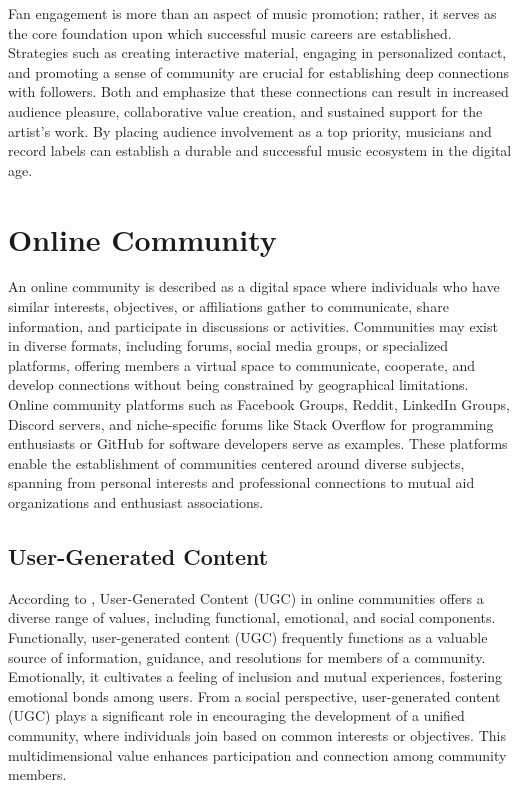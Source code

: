Fan engagement is more than an aspect of music promotion; rather, it serves as the core foundation upon which successful music careers are established. Strategies such as creating interactive material, engaging in personalized contact, and promoting a sense of community are crucial for establishing deep connections with followers. Both \textcite{edlom21} and \textcite{lee20} emphasize that these connections can result in increased audience pleasure, collaborative value creation, and sustained support for the artist's work. By placing audience involvement as a top priority, musicians and record labels can establish a durable and successful music ecosystem in the digital age.

\section{Online Community}
An online community is described as a digital space where individuals who have similar interests, objectives, or affiliations gather to communicate, share information, and participate in discussions or activities. Communities may exist in diverse formats, including forums, social media groups, or specialized platforms, offering members a virtual space to communicate, cooperate, and develop connections without being constrained by geographical limitations. Online community platforms such as Facebook Groups, Reddit, LinkedIn Groups, Discord servers, and niche-specific forums like Stack Overflow for programming enthusiasts or GitHub for software developers serve as examples. These platforms enable the establishment of communities centered around diverse subjects, spanning from personal interests and professional connections to mutual aid organizations and enthusiast associations.

\subsection{User-Generated Content}
According to \textcite{v22}, User-Generated Content (UGC) in online communities offers a diverse range of values, including functional, emotional, and social components. Functionally, user-generated content (UGC) frequently functions as a valuable source of information, guidance, and resolutions for members of a community. Emotionally, it cultivates a feeling of inclusion and mutual experiences, fostering emotional bonds among users. From a social perspective, user-generated content (UGC) plays a significant role in encouraging the development of a unified community, where individuals join based on common interests or objectives. This multidimensional value enhances participation and connection among community members. \\

